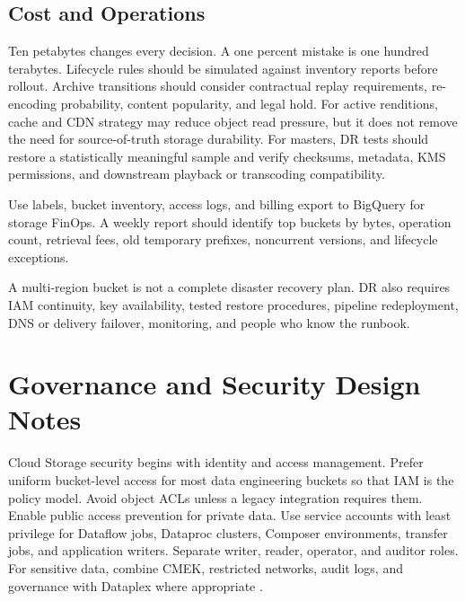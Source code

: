 \subsection{Cost and Operations}
Ten petabytes changes every decision. A one percent mistake is one hundred terabytes. Lifecycle rules should be simulated against inventory reports before rollout. Archive transitions should consider contractual replay requirements, re-encoding probability, content popularity, and legal hold. For active renditions, cache and CDN strategy may reduce object read pressure, but it does not remove the need for source-of-truth storage durability. For masters, DR tests should restore a statistically meaningful sample and verify checksums, metadata, KMS permissions, and downstream playback or transcoding compatibility.

\begin{tipbox}
Use labels, bucket inventory, access logs, and billing export to BigQuery for storage FinOps. A weekly report should identify top buckets by bytes, operation count, retrieval fees, old temporary prefixes, noncurrent versions, and lifecycle exceptions.
\end{tipbox}

\begin{pitfall}
A multi-region bucket is not a complete disaster recovery plan. DR also requires IAM continuity, key availability, tested restore procedures, pipeline redeployment, DNS or delivery failover, monitoring, and people who know the runbook.
\end{pitfall}

\section{Governance and Security Design Notes}
Cloud Storage security begins with identity and access management. Prefer uniform bucket-level access for most data engineering buckets so that IAM is the policy model. Avoid object ACLs unless a legacy integration requires them. Enable public access prevention for private data. Use service accounts with least privilege for Dataflow jobs, Dataproc clusters, Composer environments, transfer jobs, and application writers. Separate writer, reader, operator, and auditor roles. For sensitive data, combine CMEK, restricted networks, audit logs, and governance with Dataplex where appropriate \cite{googleclouddataplexdocs}.

